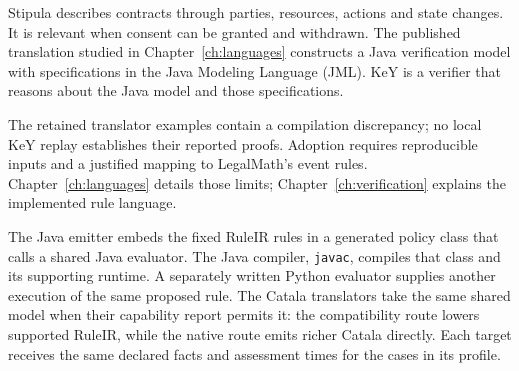 \documentclass[12pt,a4paper,oneside,openany]{book}
\begin{document}
\clearpage
{}
Stipula describes contracts through parties, resources, actions and state
changes. It is relevant when consent can be granted and withdrawn. The
published translation studied in Chapter~\ref{ch:languages} constructs a Java
verification model with specifications in the Java Modeling Language (JML).
KeY is a verifier that reasons about the Java model and those specifications.

\begin{MapDiagram}
\end{MapDiagram}

The retained translator examples contain a compilation discrepancy; no local
KeY replay establishes their reported proofs. Adoption requires reproducible
inputs and a justified mapping to LegalMath's event rules.
Chapter~\ref{ch:languages} details those limits; Chapter~\ref{ch:verification}
explains the implemented rule language.

\clearpage
{}
The Java emitter embeds the fixed RuleIR rules in a generated policy class
that calls a shared Java evaluator. The Java compiler, \texttt{javac}, compiles
that class and its supporting runtime. A separately written Python evaluator
supplies another execution of the same proposed rule. The Catala translators
take the same shared model when their capability report permits it: the
compatibility route lowers supported RuleIR, while the native route emits richer
Catala directly. Each target receives the same declared facts and assessment
times for the cases in its profile.
\end{document}

